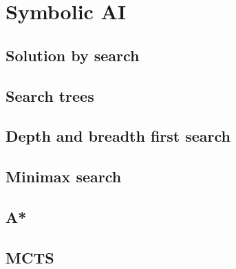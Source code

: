 \chapter{Symbolic AI}
\label{chap:symbolic:ai}


\section{Solution by search}



\section{Search trees}



\section{Depth and breadth first search}



\section{Minimax search}



\section{A*}



\section{MCTS}




